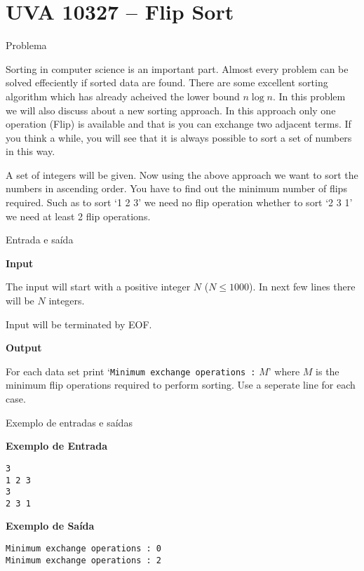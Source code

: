 \section{UVA 10327 -- Flip Sort}

\begin{frame}[fragile]{Problema}

Sorting in computer science is an important part. Almost every problem can be solved effeciently if
sorted data are found. There are some excellent sorting algorithm which has already acheived the 
lower bound $n\log n$. In this problem we will also discuss about a new sorting approach. In this 
approach only one operation (Flip) is available and that is you can exchange two adjacent terms. 
If you think a while, you will see that it is always possible to sort a set of numbers in this way.

A set of integers will be given. Now using the above approach we want to sort the numbers in
ascending order. You have to find out the minimum number of flips required. Such as to sort 
‘1 2 3’ we need no flip operation whether to sort ‘2 3 1’ we need at least 2 flip operations.

\end{frame}

\begin{frame}[fragile]{Entrada e saída}

\textbf{Input}

The input will start with a positive integer $N$ ($N\leq 1000$). In next few lines there will be 
$N$ integers.  

Input will be terminated by EOF.

\vspace{0.1in}

\textbf{Output}

For each data set print ‘\texttt{Minimum exchange operations :} $M$’ where $M$ is the minimum 
flip operations required to perform sorting. Use a seperate line for each case.

\end{frame}

\begin{frame}[fragile]{Exemplo de entradas e saídas}

\begin{minipage}[t]{0.4\textwidth}
\textbf{Exemplo de Entrada}
\begin{verbatim}
3
1 2 3
3
2 3 1
\end{verbatim}
\end{minipage}
\begin{minipage}[t]{0.55\textwidth}
\textbf{Exemplo de Saída}
\begin{verbatim}
Minimum exchange operations : 0
Minimum exchange operations : 2
\end{verbatim}
\end{minipage}
\end{frame}

